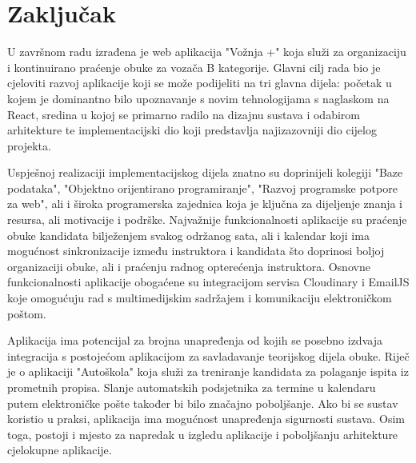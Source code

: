 \chapter*{Zaključak}
\noindent U završnom radu izrađena je web aplikacija "Vožnja +" koja služi  za organizaciju i kontinuirano praćenje obuke za vozača B kategorije. Glavni cilj rada bio je cjeloviti razvoj  aplikacije koji se može podijeliti na tri glavna dijela: početak u kojem je dominantno bilo upoznavanje s novim tehnologijama s naglaskom na React, sredina u kojoj se primarno radilo na dizajnu sustava i odabirom arhitekture te implementacijski dio koji predstavlja najizazovniji dio cijelog projekta.

\noindent Uspješnoj realizaciji implementacijskog dijela znatno su doprinijeli kolegiji "Baze podataka", "Objektno orijentirano programiranje", "Razvoj programske potpore za web", ali i široka programerska zajednica koja je ključna za dijeljenje znanja i resursa, ali motivacije i podrške. Najvažnije funkcionalnosti aplikacije su praćenje obuke kandidata bilježenjem svakog održanog sata, ali i kalendar koji ima mogućnost sinkronizacije između instruktora i kandidata što doprinosi boljoj organizaciji obuke, ali i praćenju radnog opterećenja instruktora. Osnovne funkcionalnosti aplikacije obogaćene su integracijom servisa Cloudinary i EmailJS koje omogućuju rad s multimedijskim sadržajem i komunikaciju elektroničkom poštom. 

\noindent Aplikacija ima potencijal za brojna unapređenja od kojih se posebno izdvaja integracija s postojećom aplikacijom za savladavanje teorijskog dijela obuke. Riječ je o aplikaciji "Autoškola" koja služi  za treniranje kandidata za polaganje ispita iz prometnih propisa. Slanje automatskih podsjetnika za termine u kalendaru putem elektroničke pošte također bi bilo značajno poboljšanje. Ako bi se sustav koristio u praksi, aplikacija ima mogućnost unapređenja sigurnosti sustava. Osim toga, postoji i mjesto za napredak u izgledu aplikacije i poboljšanju arhitekture cjelokupne aplikacije.